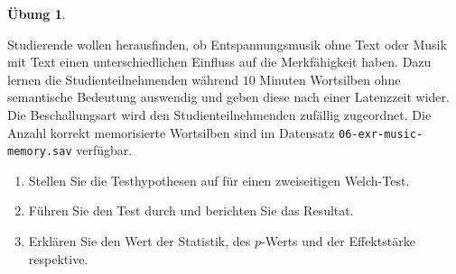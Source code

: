 \documentclass[
]{book}
\providecommand{\tightlist}{%
  \setlength{\itemsep}{0pt}\setlength{\parskip}{0pt}}
\theoremstyle{definition}
\theoremstyle{definition}
\theoremstyle{definition}
\newtheorem{exercise}{Übung}[chapter]
\theoremstyle{definition}
\theoremstyle{remark}
\begin{document}
\begin{exercise}
\protect\hypertarget{exr:music-memory}{}\label{exr:music-memory}\leavevmode

Studierende wollen herausfinden, ob Entspannungsmusik ohne Text oder Musik mit Text einen unterschiedlichen Einfluss auf die Merkfähigkeit haben. Dazu lernen die Studienteilnehmenden während \(10\) Minuten Wortsilben ohne semantische Bedeutung auswendig und geben diese nach einer Latenzzeit wider. Die Beschallungsart wird den Studienteilnehmenden zufällig zugeordnet. Die Anzahl korrekt memorisierte Wortsilben sind im Datensatz \texttt{06-exr-music-memory.sav} verfügbar.

\begin{enumerate}
\def\labelenumi{\alph{enumi})}
\tightlist
\item
  Stellen Sie die Testhypothesen auf für einen zweiseitigen Welch-Test.
\item
  Führen Sie den Test durch und berichten Sie das Resultat.
\item
  Erklären Sie den Wert der Statistik, des \(p\)-Werts und der Effektstärke respektive.
\end{enumerate}

\end{exercise}
\end{document}
